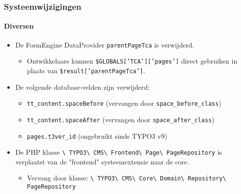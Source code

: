 
\begin{frame}[fragile]
	\frametitle{Systeemwijzigingen}
	\framesubtitle{Diversen}

	\begin{itemize}
		\item De FormEngine DataProvider \texttt{parentPageTca} is verwijderd.

			\begin{itemize}\smaller
				\item[\ding{228}] Ontwikkelaars kunnen \texttt{\$GLOBALS['TCA']['pages']} direct gebruiken in plaats van \texttt{\$result['parentPageTca']}.
			\end{itemize}\normalsize

		\item De volgende database-velden zijn verwijderd:

			\begin{itemize}\smaller
				\item \texttt{tt\_content.spaceBefore} (vervangen door \texttt{space\_before\_class})
				\item \texttt{tt\_content.spaceAfter} (vervangen door \texttt{space\_after\_class})
				\item \texttt{pages.t3ver\_id} (ongebruikt sinds TYPO3 v9)
			\end{itemize}\normalsize

			\item De PHP klasse
				\texttt{\textbackslash
					TYPO3\textbackslash
					CMS\textbackslash
					Frontend\textbackslash
					Page\textbackslash
					PageRepository} is verplaatst van de "frontend" systeemextensie naar de core.

				\begin{itemize}\smaller
					\item Vervang door klasse:
						\texttt{\textbackslash
							TYPO3\textbackslash
							CMS\textbackslash
							Core\textbackslash
							Domain\textbackslash
							Repository\textbackslash
							PageRepository}
				\end{itemize}\normalsize

	\end{itemize}

\end{frame}

